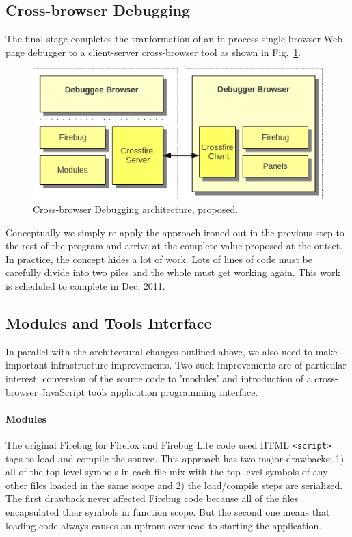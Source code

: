 \subsection{Cross-browser Debugging}
The final stage completes the tranformation of an in-process single browser Web
page debugger to a client-server cross-browser tool as shown in
Fig.~\ref{fig:crossbrowser}. \begin{figure}[htp]
  \includegraphics  [width = 86 mm] {figures/crossbrowser.png}
  \caption{Cross-browser Debugging architecture, proposed.}
 \label{fig:crossbrowser}
\end{figure}
Conceptually we simply re-apply the approach ironed out in the previous step to
the rest of the program and arrive at the complete value proposed at the outset.
In practice, the concept hides a lot of work. Lots of lines of code must be
carefully divide into two piles and the whole must get working again. This work
is scheduled to complete in Dec. 2011.

\subsection{Modules and Tools Interface}
In parallel with the architectural changes outlined above, we also need to make important infrastructure improvements.
Two such improvements are of particular interest: conversion of the source code to 'modules' and introduction of a cross-browser JavaScript tools application programming interface.

\paragraph{Modules} The original Firebug for Firefox and Firebug Lite code used HTML \texttt{<script>} tags to load and compile the source. This approach has two major drawbacks: 1) all of the top-level symbols in each file mix with the top-level symbols of any other files loaded in the same scope and 2) the load/compile steps are serialized. The first drawback never affected Firebug code because all of the files encapsulated their symbols in function scope. But the second one means that loading code always causes an upfront overhead to starting the application.

